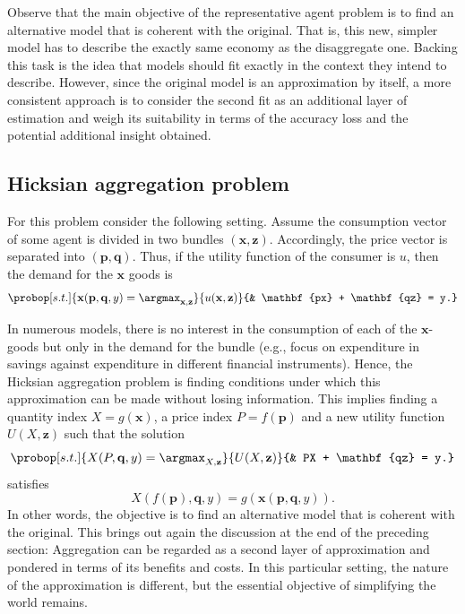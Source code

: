 \documentclass[english, a4paper, 12pt]{article}
\begin{document}
Observe that the main objective of the representative agent problem is to find an alternative model that is coherent with the original. That is, this new, simpler model has to describe the exactly same economy as the disaggregate one. Backing this task is the idea that models should fit exactly in the context they intend to describe. However, since the original model is an approximation by itself, a more consistent approach is to consider the second fit as an additional layer of estimation and weigh its suitability in terms of the accuracy loss and the potential additional insight obtained.

\subsection{Hicksian aggregation problem} \label{ssec:HicksAgg}
For this problem consider the following setting. Assume the consumption vector of some agent is divided in two bundles $(\mathbf{x}, \mathbf{z})$. Accordingly, the price vector is separated into $(\mathbf{p}, \mathbf{q})$. Thus, if the utility function of the consumer is $u$, then the demand for the $\mathbf{x}$ goods is
	\begin{equation} \label{eq:hickdisprob}
		\probop[s.t.]{\mathbf{x}(\mathbf{p}, \mathbf{q}, y) = \argmax_{\mathbf{x}, \mathbf{z}}}{u(\mathbf{x}, \mathbf{z})}
					{&	\mathbf{px} + \mathbf{qz} = y.}
	\end{equation}

In numerous models, there is no interest in the consumption of each of the $\mathbf{x}$-goods but only in the demand for the bundle (e.g., focus on expenditure in savings against expenditure in different financial instruments). Hence, the Hicksian aggregation problem is finding conditions under which this approximation can be made without losing information. This implies finding a quantity index $X = g(\mathbf{x})$, a price index $P = f(\mathbf{p})$ and a new utility function $U(X, \mathbf{z})$ such that the solution
	 \begin{equation} \label{eq:hickaggprob}
		\probop[s.t.]{X(P, \mathbf{q}, y) = \argmax_{X, \mathbf{z}}}{U(X, \mathbf{z})}
					{&	PX + \mathbf{qz} = y.}
	\end{equation}
satisfies
	$$X(f(\mathbf{p}), \mathbf{q}, y) = g(\mathbf{x}(\mathbf{p}, \mathbf{q}, y)).$$
In other words, the objective is to find an alternative model that is coherent with the original. This brings out again the discussion at the end of the preceding section: Aggregation can be regarded as a second layer of approximation and pondered in terms of its benefits and costs. In this particular setting, the nature of the approximation is different, but the essential objective of simplifying the world remains.
\end{document}

